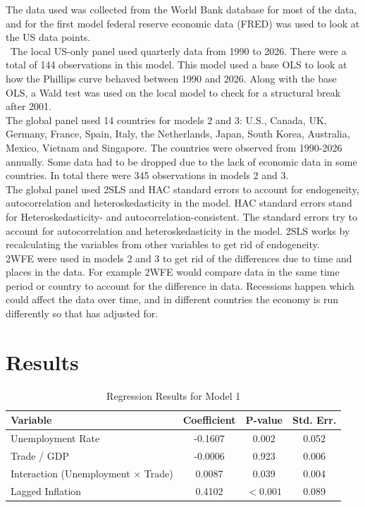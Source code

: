 \documentclass{article}
\begin{document}
The data used was collected from the World Bank database for most of the data, and for the first model federal reserve economic data (FRED) was used to look at the US data points. 
\newline
\\\
The local US-only panel used quarterly data from 1990 to 2026. There were a total of 144 observations in this model. This model used a base OLS to look at how the Phillips curve behaved between 1990 and 2026.  Along with the base OLS, a Wald test was used on the local model to check for a structural break after 2001\autocite{statshowto_wald}.
\newline
\\
The global panel used 14 countries for models 2 and 3: U.S., Canada, UK, Germany, France, Spain, Italy, the Netherlands, Japan, South Korea, Australia, Mexico, Vietnam and Singapore. The countries were observed from 1990-2026 annually. Some data had to be dropped due to the lack of economic data in some countries. In total there were 345 observations in models 2 and 3.
\newline
\\
The global panel used 2SLS and HAC standard errors to account for endogeneity, autocorrelation and heteroskedasticity in the model. HAC standard errors stand for Heteroskedasticity- and autocorrelation-consistent. The standard errors try to account for autocorrelation and heteroskedasticity in the model. 2SLS works by recalculating the variables from other variables to get rid of endogeneity\autocite{timeseries_2sls}. 
\newline
\\
2WFE were used in models 2 and 3 to get rid of the differences due to time and places in the data\autocite{metricgate_2wfe}. For example 2WFE would compare data in the same time period or country to account for the difference in data. Recessions happen which could affect the data over time, and in different countries the economy is run differently so that has adjusted for.
\section{Results}

\begin{table}[H]
\centering
\begin{tabular}{|l|c|c|c|}
\hline
Variable & Coefficient & P-value & Std. Err. \\
\hline
Unemployment Rate & -0.1607 & 0.002 & 0.052 \\
Trade / GDP & -0.0006 & 0.923 & 0.006 \\
Interaction (Unemployment $\times$ Trade) & 0.0087 & 0.039 & 0.004 \\
Lagged Inflation & 0.4102 & $<0.001$ & 0.089 \\
\hline
\end{tabular}
\caption{Regression Results for Model 1}
\label{tab:model1}
\end{table}
\end{document}
